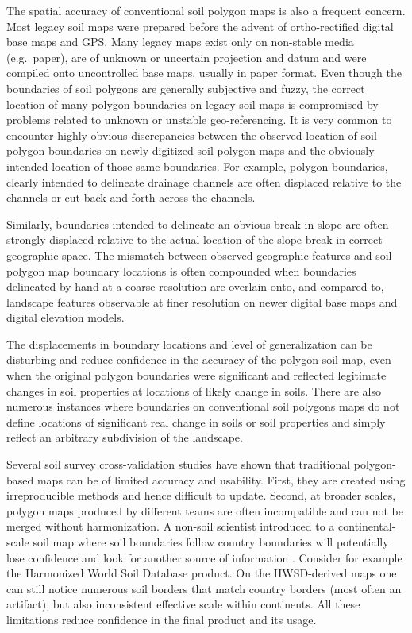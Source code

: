 \documentclass[11pt]{krantz}
\theoremstyle{definition}
\theoremstyle{definition}
\theoremstyle{definition}
\theoremstyle{remark}
\begin{document}
The spatial accuracy of conventional soil polygon maps is also a
frequent concern. Most legacy soil maps were prepared before the advent
of ortho-rectified digital base maps and GPS. Many legacy maps exist
only on non-stable media (e.g.~paper), are of unknown or uncertain
projection and datum and were compiled onto uncontrolled base maps,
usually in paper format. Even though the boundaries of soil polygons are
generally subjective and fuzzy, the correct location of many polygon
boundaries on legacy soil maps is compromised by problems related to
unknown or unstable geo-referencing. It is very common to encounter
highly obvious discrepancies between the observed location of soil
polygon boundaries on newly digitized soil polygon maps and the
obviously intended location of those same boundaries. For example,
polygon boundaries, clearly intended to delineate drainage channels are
often displaced relative to the channels or cut back and forth across
the channels.

Similarly, boundaries intended to delineate an obvious break in slope
are often strongly displaced relative to the actual location of the
slope break in correct geographic space. The mismatch between observed
geographic features and soil polygon map boundary locations is often
compounded when boundaries delineated by hand at a coarse resolution are
overlain onto, and compared to, landscape features observable at finer
resolution on newer digital base maps and digital elevation models.

The displacements in boundary locations and level of generalization can
be disturbing and reduce confidence in the accuracy of the polygon soil
map, even when the original polygon boundaries were significant and
reflected legitimate changes in soil properties at locations of likely
change in soils. There are also numerous instances where boundaries on
conventional soil polygons maps do not define locations of significant
real change in soils or soil properties and simply reflect an arbitrary
subdivision of the landscape.

Several soil survey cross-validation studies
\citep{Marsman1986ALTERRA, Hengl2006SSSAJ} have shown that traditional
polygon-based maps can be of limited accuracy and usability. First, they
are created using irreproducible methods and hence difficult to update.
Second, at broader scales, polygon maps produced by different teams are
often incompatible and can not be merged without harmonization. A
non-soil scientist introduced to a continental-scale soil map where soil
boundaries follow country boundaries will potentially lose confidence
and look for another source of information \citep{DAvello1998SSH}.
Consider for example the Harmonized World Soil Database product. On the
HWSD-derived maps one can still notice numerous soil borders that match
country borders (most often an artifact), but also inconsistent
effective scale within continents. All these limitations reduce
confidence in the final product and its usage.
\end{document}
